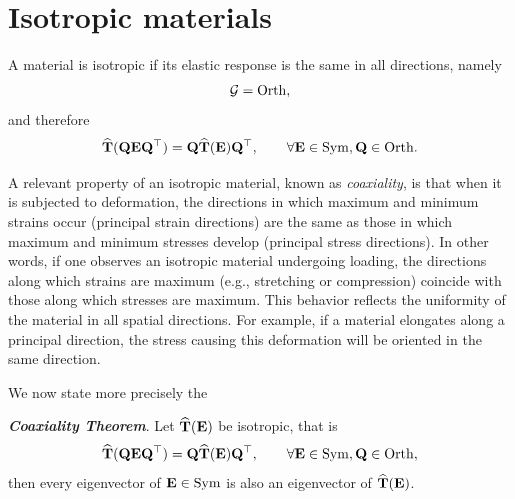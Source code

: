 \section{Isotropic materials}
A material is isotropic if its elastic response is the same in all directions, namely
\begin{equation}
	\mathcal{G} ={\rm Orth},
\end{equation}
and therefore
\begin{equation}
	\widehat{\mathbf{T}}(\mathbf{Q} \mathbf{E} \mathbf{Q} ^\top)=\mathbf{Q} \widehat{\mathbf{T}}(\mathbf{E})\mathbf{Q} ^\top, \qquad \forall \mathbf{E} \in \operatorname{Sym}, \mathbf{Q} \in {\rm Orth}.
\end{equation}

A relevant property of an isotropic material, known as \textit{coaxiality}, is that
when it is subjected to deformation, the directions in which maximum and minimum strains occur (principal strain directions) are the same as those in which maximum and minimum stresses develop (principal stress directions). In other words, if one observes an isotropic material undergoing loading, the directions along which strains are maximum (e.g., stretching or compression) coincide with those along which stresses are maximum. This behavior reflects the uniformity of the material in all spatial directions. For example, if a material elongates along a principal direction, the stress causing this deformation will be oriented in the same direction.

We now state more precisely the 
\begin{definition}
 \textit{\textbf{Coaxiality Theorem}}.	Let $\widehat{\mathbf{T}}(\mathbf{E})$ be isotropic, that is
	\begin{equation}
		\widehat{\mathbf{T}}(\mathbf{Q} \mathbf{E} \mathbf{Q} ^\top)=\mathbf{Q} \widehat{\mathbf{T}}(\mathbf{E})\mathbf{Q} ^\top, \qquad \forall \mathbf{E} \in \operatorname{Sym}, \mathbf{Q} \in {\rm Orth},
	\end{equation}
	then every eigenvector of $\mathbf{E}\in \operatorname{Sym}$ is also an eigenvector of $\widehat{\mathbf{T}}(\mathbf{E})$.
\end{definition}

